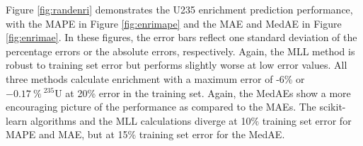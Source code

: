 Figure \ref{fig:randenri} demonstrates the \gls{U235} enrichment prediction
performance, with the \gls{MAPE} in Figure \ref{fig:enrimape} and the \gls{MAE}
and \gls{MedAE} in Figure \ref{fig:enrimae}. In these figures, the error bars
reflect one standard deviation of the percentage errors or the absolute errors,
respectively.  Again, the \gls{MLL} method is robust to training set error but
performs slightly worse at low error values.  All three methods calculate
enrichment with a maximum error of -6\% or $-0.17\:\%\:{}^{235}\text{U}$ at
20\% error in the training set. Again, the \gls{MedAE}s show a more encouraging
picture of the performance as compared to the \gls{MAE}s. The scikit-learn
algorithms and the \gls{MLL} calculations diverge at 10\% training set error
for \gls{MAPE} and \gls{MAE}, but at 15\% training set error for the
\gls{MedAE}.

